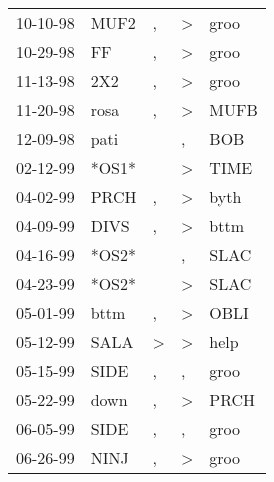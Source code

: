 \begin{supertabular}{p{0.07\textwidth}p{0.06\textwidth}p{0.02\textwidth}p{0.02\textwidth}p{0.06\textwidth}}
 10-10-98\textsuperscript{} &  MUF2\textsuperscript{} &             , &  \textgreater &           groo\textsuperscript{} \\
 10-29-98\textsuperscript{} &    FF\textsuperscript{} &             , &  \textgreater &           groo\textsuperscript{} \\
 11-13-98\textsuperscript{} &   2X2\textsuperscript{} &             , &  \textgreater &           groo\textsuperscript{} \\
 11-20-98\textsuperscript{} &  rosa\textsuperscript{} &             , &  \textgreater &           MUFB\textsuperscript{} \\
 12-09-98\textsuperscript{} &  pati\textsuperscript{} &               &             , &            BOB\textsuperscript{} \\
 02-12-99\textsuperscript{} &                   *OS1* &               &  \textgreater &           TIME\textsuperscript{} \\
 04-02-99\textsuperscript{} &  PRCH\textsuperscript{} &             , &  \textgreater &           byth\textsuperscript{} \\
 04-09-99\textsuperscript{} &  DIVS\textsuperscript{} &             , &  \textgreater &           bttm\textsuperscript{} \\
 04-16-99\textsuperscript{} &                   *OS2* &               &             , &           SLAC\textsuperscript{} \\
 04-23-99\textsuperscript{} &                   *OS2* &               &  \textgreater &           SLAC\textsuperscript{} \\
 05-01-99\textsuperscript{} &  bttm\textsuperscript{} &             , &  \textgreater &           OBLI\textsuperscript{} \\
 05-12-99\textsuperscript{} &  SALA\textsuperscript{} &  \textgreater &  \textgreater &           help\textsuperscript{} \\
 05-15-99\textsuperscript{} &  SIDE\textsuperscript{} &             , &             , &           groo\textsuperscript{} \\
 05-22-99\textsuperscript{} &  down\textsuperscript{} &             , &  \textgreater &           PRCH\textsuperscript{} \\
 06-05-99\textsuperscript{} &  SIDE\textsuperscript{} &             , &             , &           groo\textsuperscript{} \\
 06-26-99\textsuperscript{} &  NINJ\textsuperscript{} &             , &  \textgreater &           groo\textsuperscript{} \\

\end{supertabular}
